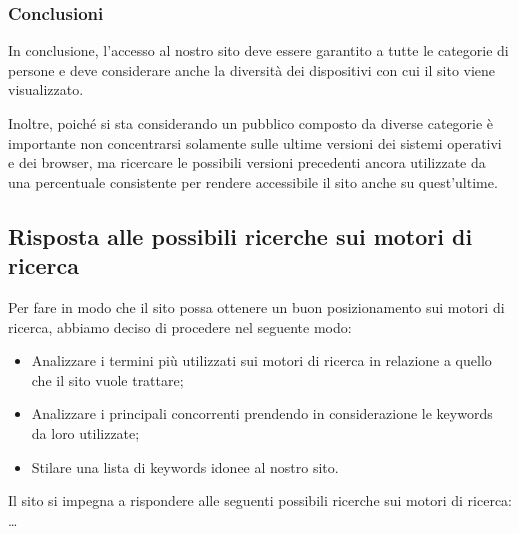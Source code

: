 \subsubsection{Conclusioni}

In conclusione, l'accesso al nostro sito deve essere garantito a tutte le categorie di persone e deve considerare anche la diversità
dei dispositivi con cui il sito viene visualizzato.

Inoltre, poiché si sta considerando un pubblico composto da diverse categorie è importante non concentrarsi solamente sulle ultime versioni
dei sistemi operativi e dei browser, ma ricercare le possibili versioni precedenti ancora utilizzate da una percentuale consistente per rendere
accessibile il sito anche su quest'ultime.

\subsection{Risposta alle possibili ricerche sui motori di ricerca}

Per fare in modo che il sito possa ottenere un buon posizionamento sui motori di ricerca, abbiamo deciso di procedere nel seguente modo:
\begin{itemize}
    \item Analizzare i termini più utilizzati sui motori di ricerca in relazione a quello che il sito vuole trattare;
    \item Analizzare i principali concorrenti prendendo in considerazione le keywords da loro utilizzate;
    \item Stilare una lista di keywords idonee al nostro sito.
\end{itemize}

Il sito si impegna a rispondere alle seguenti possibili ricerche sui motori di ricerca:
\dots
